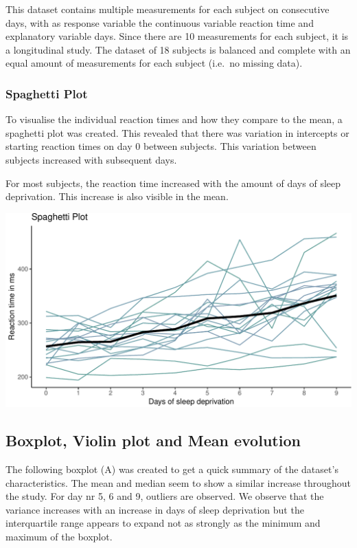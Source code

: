 \documentclass[
]{article}
\begin{document}
This dataset contains multiple measurements for each subject on
consecutive days, with as response variable the continuous variable
reaction time and explanatory variable days. Since there are 10
measurements for each subject, it is a longitudinal study. The dataset
of 18 subjects is balanced and complete with an equal amount of
measurements for each subject (i.e.~no missing data).

\hypertarget{spaghetti-plot}{%
\subsubsection{Spaghetti Plot}\label{spaghetti-plot}}

To visualise the individual reaction times and how they compare to the
mean, a spaghetti plot was created. This revealed that there was
variation in intercepts or starting reaction times on day 0 between
subjects. This variation between subjects increased with subsequent
days.

For most subjects, the reaction time increased with the amount of days
of sleep deprivation. This increase is also visible in the mean.

\begin{center}\includegraphics{common_sleep_files/figure-latex/spaghetti-1} \end{center}

\hypertarget{boxplot-violin-plot-and-mean-evolution}{%
\subsection{Boxplot, Violin plot and Mean
evolution}\label{boxplot-violin-plot-and-mean-evolution}}

The following boxplot (A) was created to get a quick summary of the
dataset's characteristics. The mean and median seem to show a similar
increase throughout the study. For day nr 5, 6 and 9, outliers are
observed. We observe that the variance increases with an increase in
days of sleep deprivation but the interquartile range appears to expand
not as strongly as the minimum and maximum of the boxplot.
\end{document}
